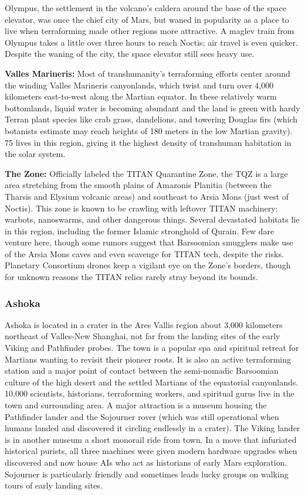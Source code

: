 Olympus, the settlement in the volcano's caldera 
around the base of the space elevator, was once the 
chief city of Mars, but waned in popularity as a place 
to live when terraforming made other regions more 
attractive. A maglev train from Olympus takes a little 
over three hours to reach Noctis; air travel is even 
quicker. Despite the waning of the city, the space elevator
still sees heavy use.

\textbf{Valles Marineris:} Most of transhumanity's terraforming
efforts center around the winding Valles
Marineris canyonlands, which twist and turn over 
4,000 kilometers east-to-west along the Martian 
equator. In these relatively warm bottomlands, liquid 
water is becoming abundant and the land is green with 
hardy Terran plant species like crab grass, dandelions, 
and towering Douglas firs (which botanists estimate 
may reach heights of 180 meters in the low Martian 
gravity). 75%
lives in this region, giving it the highest density of 
transhuman habitation in the solar system.

\textbf{The Zone:} Officially labeled the TITAN Quarantine
Zone, the TQZ is a large area stretching from
the smooth plains of Amazonis Planitia (between the 
Tharsis and Elysium volcanic areas) and southeast to 
Arsia Mons (just west of Noctis). This zone is known 
to be crawling with leftover TITAN machinery: 
warbots, nanoswarms, and other dangerous things. 
Several devastated habitats lie in this region, including 
the former Islamic stronghold of Qurain. Few dare 
venture here, though some rumors suggest that Barsoomian
smugglers make use of the Arsia Mons caves
and even scavenge for TITAN tech, despite the risks. 
Planetary Consortium drones keep a vigilant eye on 
the Zone's borders, though for unknown reasons the 
TITAN relics rarely stray beyond its bounds.

\subsubsection{Ashoka}

Ashoka is located in a crater in the Ares Vallis region 
about 3,000 kilometers northeast of Valles-New 
Shanghai, not far from the landing sites of the early 
Viking and Pathfinder probes. The town is a popular 
spa and spiritual retreat for Martians wanting to revisit
their pioneer roots. It is also an active terraforming
station and a major point of contact between the semi-nomadic
Barsoomian culture of the high desert and
the settled Martians of the equatorial canyonlands. 
10,000 scientists, historians, terraforming workers, 
and spiritual gurus live in the town and surrounding 
area. A major attraction is a museum housing the 
Pathfinder lander and the Sojourner rover (which was 
still operational when humans landed and discovered 
it circling endlessly in a crater). The Viking lander is in 
another museum a short monorail ride from town. In 
a move that infuriated historical purists, all three machines
were given modern hardware upgrades when
discovered and now house AIs who act as historians 
of early Mars exploration. Sojourner is particularly 
friendly and sometimes leads lucky groups on walking 
tours of early landing sites.

